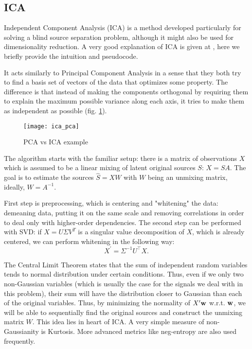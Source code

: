 \documentclass[../main.tex]{subfiles} %
\begin{document}
\subsection{ICA}

Independent Component Analysis (ICA) is a method developed particularly for solving a blind source separation problem, although it might also be used for dimensionality reduction. 
A very good explanation of ICA is given at \cite{ica}, here we briefly provide the intuition and pseudocode.

It acts similarly to Principal Component Analysis in a sense that they both try to find a basis set of vectors of the data that optimizes some property. 
The difference is that instead of making the components orthogonal by requiring them to explain the maximum possible variance along each axis, it tries to make them as independent as possible (fig. \ref{fig:icapca}).

\begin{figure}[h!]
	\centering
	\texttt{[image: ica\_pca]}
	\caption{PCA vs ICA example}
	\label{fig:icapca}
\end{figure}

The algorithm starts with the familiar setup: there is a matrix of observations $X$ which is assumed to be a linear mixing of latent original sources $S$: $X = S A$. 
The goal is to estimate the sources $\hat S = X W$ with $W$ being an unmixing matrix, ideally, $W = A^{-1}$.

First step is preprocessing, which is centering and "whitening" the data: demeaning data, putting it on the same scale and removing correlations in order to deal only with higher-order dependencies.
The second step can be performed with SVD: if $X = U \Sigma V^T$ is a singular value decomposition of $X$, which is already centered, we can perform whitening in the following way: \[X^\prime = \Sigma^{-1} U^\top  X.\]

The Central Limit Theorem states that the sum of independent random variables tends to normal distribution under certain conditions. 
Thus, even if we only two non-Gaussian variables (which is usually the case for the signals we deal with in this problem), their sum will have the distribution closer to Gaussian than each of the original variables. 
Thus, by minimizing the normality of $X^\prime {\mathbf w}$ w.r.t. ${\mathbf w}$, we will be able to sequentially find the original sources and construct the unmixing matrix $W$.
This idea lies in heart of ICA.
A very simple measure of non-Gaussianity is Kurtosis. 
More advanced metrics like neg-entropy are also used frequently.
\end{document}
